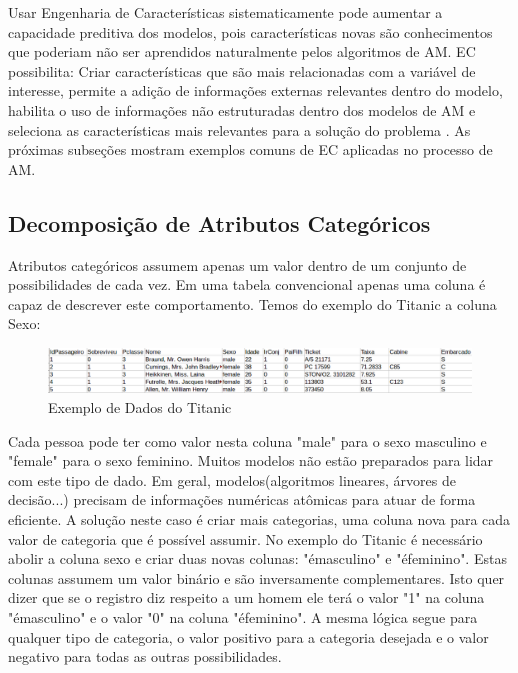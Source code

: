 Usar Engenharia de Características sistematicamente pode aumentar a capacidade preditiva dos modelos, pois características novas são conhecimentos que poderiam não ser aprendidos naturalmente pelos algoritmos de AM. EC possibilita: Criar características que são mais relacionadas com a variável de interesse, permite a adição de informações externas relevantes dentro do modelo, habilita o uso de informações não estruturadas dentro dos modelos de AM e seleciona as características mais relevantes para a solução do problema \cite{real2013}. As próximas subseções mostram exemplos comuns de EC aplicadas no processo de AM.

\subsection{Decomposição de Atributos Categóricos}
Atributos categóricos assumem apenas um valor dentro de um conjunto de possibilidades de cada vez. Em uma tabela convencional apenas uma coluna é capaz de descrever este comportamento. Temos do exemplo do Titanic a coluna Sexo: 

\begin{figure}[!h]
\centering
\includegraphics[keepaspectratio=true,scale=0.40]
{figuras/dataEg.eps}
\caption{Exemplo de Dados do Titanic}
\label{data_titatic}
\end{figure}

Cada pessoa pode ter como valor nesta coluna "male" para o sexo masculino e "female" para o sexo feminino. Muitos modelos não estão preparados para lidar com este tipo de dado. Em geral, modelos(algoritmos lineares, árvores de decisão...) precisam de informações numéricas atômicas para atuar de forma eficiente. A solução neste caso é criar mais categorias, uma coluna nova para cada valor de categoria que é possível assumir. No exemplo do Titanic é necessário abolir a coluna sexo e criar duas novas colunas: "émasculino" e "éfeminino". Estas colunas assumem um valor binário e são inversamente complementares. Isto quer dizer que se o registro diz respeito a um homem ele terá o valor "1" na coluna "émasculino" e o valor "0" na coluna "éfeminino". A mesma lógica segue para qualquer tipo de categoria, o valor positivo para a categoria desejada e o valor negativo para todas as outras possibilidades.

